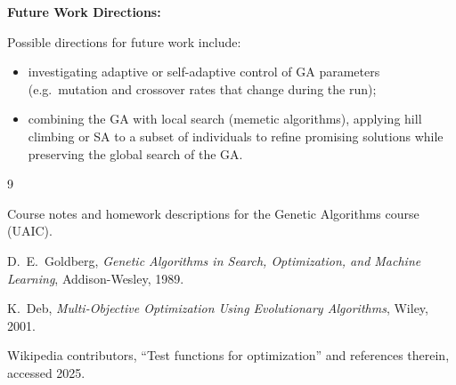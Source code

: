 \documentclass[a4paper,11pt]{article}
\begin{document}
\vspace{1.5em}

\noindent\textbf{Future Work Directions:}

\vspace{0.5em}

Possible directions for future work include:
\begin{itemize}
  \item investigating adaptive or self-adaptive control of GA parameters
        (e.g.\ mutation and crossover rates that change during the run);
  \item combining the GA with local search (memetic algorithms), applying
        hill climbing or SA to a subset of individuals to refine promising
        solutions while preserving the global search of the GA.
\end{itemize}

\begin{thebibliography}{9}

Course notes and homework descriptions for the Genetic Algorithms
course (UAIC).

D.~E.~Goldberg,
\emph{Genetic Algorithms in Search, Optimization, and Machine Learning},
Addison-Wesley, 1989.

K.~Deb,
\emph{Multi-Objective Optimization Using Evolutionary Algorithms},
Wiley, 2001.

Wikipedia contributors,
``Test functions for optimization'' and references therein,
accessed 2025.

\end{thebibliography}
\end{document}

